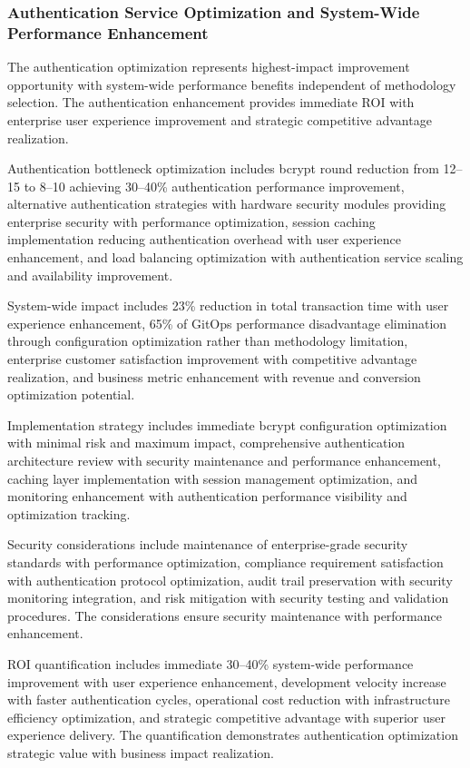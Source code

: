 \subsubsection{Authentication Service Optimization and System-Wide Performance Enhancement}

The authentication optimization represents highest-impact improvement opportunity with system-wide performance benefits independent of methodology selection. The authentication enhancement provides immediate ROI with enterprise user experience improvement and strategic competitive advantage realization.

Authentication bottleneck optimization includes bcrypt round reduction from 12--15 to 8--10 achieving 30--40\% authentication performance improvement, alternative authentication strategies with hardware security modules providing enterprise security with performance optimization, session caching implementation reducing authentication overhead with user experience enhancement, and load balancing optimization with authentication service scaling and availability improvement.

System-wide impact includes 23\% reduction in total transaction time with user experience enhancement, 65\% of GitOps performance disadvantage elimination through configuration optimization rather than methodology limitation, enterprise customer satisfaction improvement with competitive advantage realization, and business metric enhancement with revenue and conversion optimization potential.

Implementation strategy includes immediate bcrypt configuration optimization with minimal risk and maximum impact, comprehensive authentication architecture review with security maintenance and performance enhancement, caching layer implementation with session management optimization, and monitoring enhancement with authentication performance visibility and optimization tracking.

Security considerations include maintenance of enterprise-grade security standards with performance optimization, compliance requirement satisfaction with authentication protocol optimization, audit trail preservation with security monitoring integration, and risk mitigation with security testing and validation procedures. The considerations ensure security maintenance with performance enhancement.

ROI quantification includes immediate 30--40\% system-wide performance improvement with user experience enhancement, development velocity increase with faster authentication cycles, operational cost reduction with infrastructure efficiency optimization, and strategic competitive advantage with superior user experience delivery. The quantification demonstrates authentication optimization strategic value with business impact realization.

